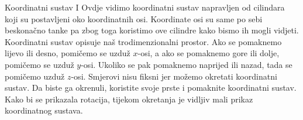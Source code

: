 \begin{surferPage}[Coordinates I]{Koordinatni sustav I}
Ovdje vidimo koordinatni sustav napravljen od cilindara koji su postavljeni oko koordinatnih osi. Koordinate osi su same po sebi beskona\v cno tanke pa zbog toga koristimo ove cilindre kako bismo ih mogli vidjeti.\\
Koordinatni sustav opisuje na\v s trodimenzionalni prostor. Ako se pomaknemo lijevo ili desno, pomi\v cemo se uzdu\v z $x$-osi, a ako se pomaknemo gore ili dolje, pomi\v cemo se uzdu\v z $y$-osi. Ukoliko se pak pomaknemo naprijed ili nazad, tada se pomi\v cemo uzdu\v z $z$-osi. Smjerovi nisu fiksni jer mo\v zemo okretati koordinatni sustav.
\vspace{0.3cm}
Da biste ga okrenuli, koristite svoje prste i pomaknite koordinatni sustav. Kako bi se prikazala rotacija, tijekom okretanja je vidljiv mali prikaz koordinatnog sustava.
\end{surferPage}
